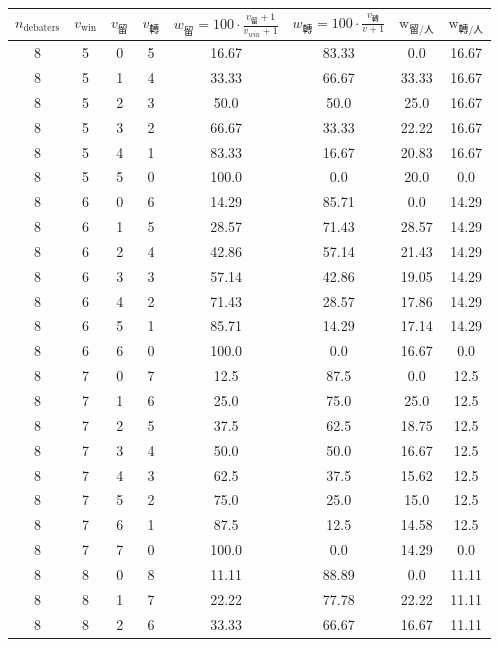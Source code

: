 \documentclass[9pt]{article}
\begin{document}
\begin{table}[h]
    \centering
    \small
    \begin{threeparttable}
    \begin{tabular}{cccccccc}
    \toprule
    $n_{\text{debaters}}$ & $v_{\text{win}}$ & $v_{\text{留}}$ & $v_{\text{轉}}$ & $w_{\text{留}} = 100 \cdot \frac{v_{\text{留}}+1}{v_{win}+1} $ & $w_{\text{轉}} = 100\cdot\frac{v_{\text{轉}}}{v+1}$ & $\text{w}_{\text{留}/\text{人} }$ & $\text{w}_{\text{轉}/\text{人}}$ \\
    \midrule
8 & 5 & 0 & 5 & 16.67 & 83.33 & 0.0 & 16.67 \\
8 & 5 & 1 & 4 & 33.33 & 66.67 & 33.33 & 16.67 \\
8 & 5 & 2 & 3 & 50.0 & 50.0 & 25.0 & 16.67 \\
8 & 5 & 3 & 2 & 66.67 & 33.33 & 22.22 & 16.67 \\
8 & 5 & 4 & 1 & 83.33 & 16.67 & 20.83 & 16.67 \\
8 & 5 & 5 & 0 & 100.0 & 0.0 & 20.0 & 0.0 \\
8 & 6 & 0 & 6 & 14.29 & 85.71 & 0.0 & 14.29 \\
8 & 6 & 1 & 5 & 28.57 & 71.43 & 28.57 & 14.29 \\
8 & 6 & 2 & 4 & 42.86 & 57.14 & 21.43 & 14.29 \\
8 & 6 & 3 & 3 & 57.14 & 42.86 & 19.05 & 14.29 \\
8 & 6 & 4 & 2 & 71.43 & 28.57 & 17.86 & 14.29 \\
8 & 6 & 5 & 1 & 85.71 & 14.29 & 17.14 & 14.29 \\
8 & 6 & 6 & 0 & 100.0 & 0.0 & 16.67 & 0.0 \\
8 & 7 & 0 & 7 & 12.5 & 87.5 & 0.0 & 12.5 \\
8 & 7 & 1 & 6 & 25.0 & 75.0 & 25.0 & 12.5 \\
8 & 7 & 2 & 5 & 37.5 & 62.5 & 18.75 & 12.5 \\
8 & 7 & 3 & 4 & 50.0 & 50.0 & 16.67 & 12.5 \\
8 & 7 & 4 & 3 & 62.5 & 37.5 & 15.62 & 12.5 \\
8 & 7 & 5 & 2 & 75.0 & 25.0 & 15.0 & 12.5 \\
8 & 7 & 6 & 1 & 87.5 & 12.5 & 14.58 & 12.5 \\
8 & 7 & 7 & 0 & 100.0 & 0.0 & 14.29 & 0.0 \\
8 & 8 & 0 & 8 & 11.11 & 88.89 & 0.0 & 11.11 \\
8 & 8 & 1 & 7 & 22.22 & 77.78 & 22.22 & 11.11 \\
8 & 8 & 2 & 6 & 33.33 & 66.67 & 16.67 & 11.11 \\

\end{tabular}
\end{threeparttable}
\end{table}
\end{document}
